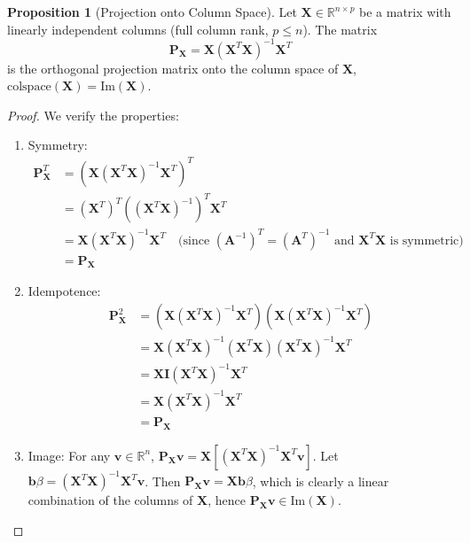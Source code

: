 \documentclass[12pt, letterpaper]{article}
\theoremstyle{definition}
\newtheorem{proposition}{Proposition}[section]
\newcommand{\R}{\mathbb{R}}
\newcommand{\mat}[1]{\mathbf{#1}} %
\newcommand{\vect}[1]{\mathbf{#1}} %
\renewcommand{\v}{\vect{v}} %
\newcommand{\bvec}{\vect{b}} %
\newcommand{\colspace}{\text{colspace}}
\newcommand{\im}{\text{Im}}
\begin{document}
\begin{proposition}[Projection onto Column Space]
Let $\mat{X} \in \R^{n \times p}$ be a matrix with linearly independent columns (full column rank, $p \le n$). The matrix
\[ \mat{P}_\mat{X} = \mat{X}(\mat{X}^T \mat{X})^{-1} \mat{X}^T \]
is the orthogonal projection matrix onto the column space of $\mat{X}$, $\colspace(\mat{X}) = \im(\mat{X})$.
\end{proposition}
\begin{proof} We verify the properties:
\begin{enumerate}
    \item Symmetry: 
    \begin{align*} \mat{P}_\mat{X}^T &= (\mat{X}(\mat{X}^T \mat{X})^{-1} \mat{X}^T)^T \\ &= (\mat{X}^T)^T ((\mat{X}^T \mat{X})^{-1})^T \mat{X}^T \\ &= \mat{X} (\mat{X}^T \mat{X})^{-1} \mat{X}^T \quad \text{(since } (\mat{A}^{-1})^T = (\mat{A}^T)^{-1} \text{ and } \mat{X}^T\mat{X} \text{ is symmetric)} \\ &= \mat{P}_\mat{X} \end{align*}
    \item Idempotence: 
    \begin{align*} \mat{P}_\mat{X}^2 &= (\mat{X}(\mat{X}^T \mat{X})^{-1} \mat{X}^T) (\mat{X}(\mat{X}^T \mat{X})^{-1} \mat{X}^T) \\ &= \mat{X}(\mat{X}^T \mat{X})^{-1} (\mat{X}^T \mat{X}) (\mat{X}^T \mat{X})^{-1} \mat{X}^T \\ &= \mat{X} \mat{I} (\mat{X}^T \mat{X})^{-1} \mat{X}^T \\ &= \mat{X}(\mat{X}^T \mat{X})^{-1} \mat{X}^T \\ &= \mat{P}_\mat{X} \end{align*}
    \item Image: For any $\v \in \R^n$, $\mat{P}_\mat{X}\v = \mat{X}[(\mat{X}^T \mat{X})^{-1} \mat{X}^T \v]$. Let $\bvec{\beta} = (\mat{X}^T \mat{X})^{-1} \mat{X}^T \v$. Then $\mat{P}_\mat{X}\v = \mat{X}\bvec{\beta}$, which is clearly a linear combination of the columns of $\mat{X}$, hence $\mat{P}_\mat{X}\v \in \im(\mat{X})$.
\end{enumerate}
\end{proof} %
\end{document}
